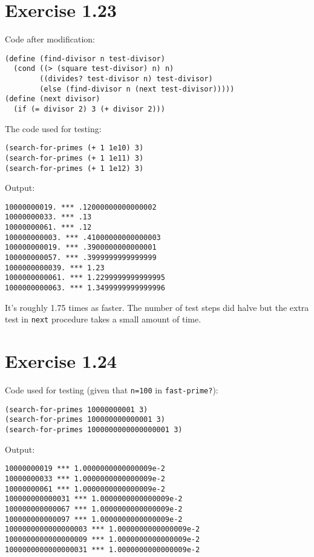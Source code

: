 \documentclass[../main.tex]{subfiles}
\begin{document}
\section{Exercise 1.23}

Code after modification:

\begin{lstlisting}
(define (find-divisor n test-divisor)
  (cond ((> (square test-divisor) n) n)
        ((divides? test-divisor n) test-divisor)
        (else (find-divisor n (next test-divisor)))))
(define (next divisor)
  (if (= divisor 2) 3 (+ divisor 2)))
\end{lstlisting}

The code used for testing:

\begin{lstlisting}
(search-for-primes (+ 1 1e10) 3)
(search-for-primes (+ 1 1e11) 3)
(search-for-primes (+ 1 1e12) 3)
\end{lstlisting}

Output:

\begin{lstlisting}
10000000019. *** .12000000000000002
10000000033. *** .13
10000000061. *** .12
100000000003. *** .41000000000000003
100000000019. *** .3900000000000001
100000000057. *** .3999999999999999
1000000000039. *** 1.23
1000000000061. *** 1.2299999999999995
1000000000063. *** 1.3499999999999996
\end{lstlisting}

It's roughly 1.75 times as faster. The number of test steps
 did halve but the extra test in \lstinline{next} procedure
 takes a small amount of time.

\section{Exercise 1.24}

Code used for testing (given that \lstinline{n=100} in \lstinline{fast-prime?}):

\begin{lstlisting}
(search-for-primes 10000000001 3)
(search-for-primes 100000000000001 3)
(search-for-primes 1000000000000000001 3)
\end{lstlisting}

Output:

\begin{lstlisting}
10000000019 *** 1.0000000000000009e-2
10000000033 *** 1.0000000000000009e-2
10000000061 *** 1.0000000000000009e-2
100000000000031 *** 1.0000000000000009e-2
100000000000067 *** 1.0000000000000009e-2
100000000000097 *** 1.0000000000000009e-2
1000000000000000003 *** 1.0000000000000009e-2
1000000000000000009 *** 1.0000000000000009e-2
1000000000000000031 *** 1.0000000000000009e-2
\end{lstlisting}
\end{document}
